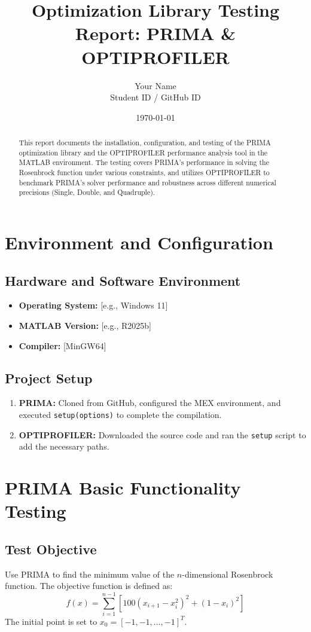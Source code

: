\documentclass[a4paper,12pt]{article}
\title{\textbf{Optimization Library Testing Report: PRIMA \& OPTIPROFILER}}
\author{Your Name \\ Student ID / GitHub ID}
\date{\today}
\begin{document}
\maketitle

\begin{abstract}
This report documents the installation, configuration, and testing of the PRIMA optimization library and the OPTIPROFILER performance analysis tool in the MATLAB environment. The testing covers PRIMA's performance in solving the Rosenbrock function under various constraints, and utilizes OPTIPROFILER to benchmark PRIMA's solver performance and robustness across different numerical precisions (Single, Double, and Quadruple).
\end{abstract}

\tableofcontents
\newpage

\section{Environment and Configuration}
\subsection{Hardware and Software Environment}
\begin{itemize}
    \item \textbf{Operating System:} [e.g., Windows 11]
    \item \textbf{MATLAB Version:} [e.g., R2025b]
    \item \textbf{Compiler:} [MinGW64]
\end{itemize}

\subsection{Project Setup}
\begin{enumerate}
    \item \textbf{PRIMA:} Cloned from GitHub, configured the MEX environment, and executed \texttt{setup(options)} to complete the compilation.
    \item \textbf{OPTIPROFILER:} Downloaded the source code and ran the \texttt{setup} script to add the necessary paths.
\end{enumerate}

\section{PRIMA Basic Functionality Testing}
\subsection{Test Objective}
Use PRIMA to find the minimum value of the $n$-dimensional Rosenbrock function.
The objective function is defined as:
\[ f(x) = \sum_{i=1}^{n-1} [100(x_{i+1} - x_i^2)^2 + (1 - x_i)^2] \]
The initial point is set to $x_0 = [-1, -1, \dots, -1]^T$.
\end{document}
